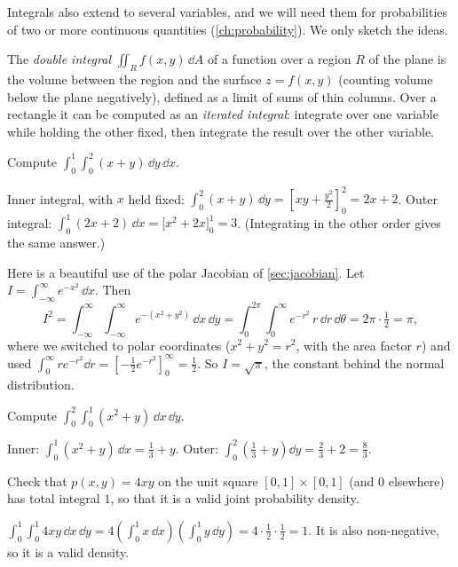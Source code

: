 Integrals also extend to several variables, and we will need them for
probabilities of two or more continuous quantities (\cref{ch:probability}). We
only sketch the ideas.

The \emph{double integral} $\iint_R f(x, y)\,\dd A$ of a function over a region
$R$ of the plane is the volume between the region and the surface
$z = f(x, y)$ (counting volume below the plane negatively), defined as a limit
of sums of thin columns. Over a rectangle it can be computed as an
\emph{iterated integral}: integrate over one variable while holding the other
fixed, then integrate the result over the other variable.

\begin{example}
Compute $\int_0^1\!\int_0^2 (x + y)\,\dd y\,\dd x$.

\sol Inner integral, with $x$ held fixed:
$\int_0^2(x + y)\,\dd y = \left[xy + \frac{y^2}{2}\right]_0^2 = 2x + 2$. Outer
integral: $\int_0^1(2x + 2)\,\dd x = \bigl[x^2 + 2x\bigr]_0^1 = 3$. (Integrating
in the other order gives the same answer.)
\end{example}

\begin{remark}
Here is a beautiful use of the polar Jacobian of \cref{sec:jacobian}. Let
$I = \int_{-\infty}^{\infty}e^{-x^2}\,\dd x$. Then
\[
  I^2 = \int_{-\infty}^{\infty}\!\int_{-\infty}^{\infty}e^{-(x^2 + y^2)}\,\dd x\,\dd y
  = \int_0^{2\pi}\!\int_0^\infty e^{-r^2}\,r\,\dd r\,\dd\theta
  = 2\pi\cdot\tfrac12 = \pi ,
\]
where we switched to polar coordinates ($x^2 + y^2 = r^2$, with the area factor
$r$) and used $\int_0^\infty re^{-r^2}\dd r = \left[-\tfrac12e^{-r^2}\right]_0^\infty
= \tfrac12$. So $I = \sqrt\pi$, the constant behind the normal distribution.
\end{remark}

\sectionexercises

\begin{exercise}
Compute $\int_0^2\!\int_0^1(x^2 + y)\,\dd x\,\dd y$.
\end{exercise}
\begin{solution}
Inner: $\int_0^1(x^2 + y)\,\dd x = \tfrac13 + y$. Outer:
$\int_0^2\left(\tfrac13 + y\right)\dd y = \tfrac23 + 2 = \tfrac83$.
\end{solution}

\begin{exercise}
Check that $p(x, y) = 4xy$ on the unit square $[0,1]\times[0,1]$ (and $0$
elsewhere) has total integral $1$, so that it is a valid joint probability
density.
\end{exercise}
\begin{solution}
$\int_0^1\!\int_0^1 4xy\,\dd x\,\dd y = 4\left(\int_0^1 x\,\dd x\right)
\left(\int_0^1 y\,\dd y\right) = 4\cdot\tfrac12\cdot\tfrac12 = 1$. It is also
non-negative, so it is a valid density.
\end{solution}

